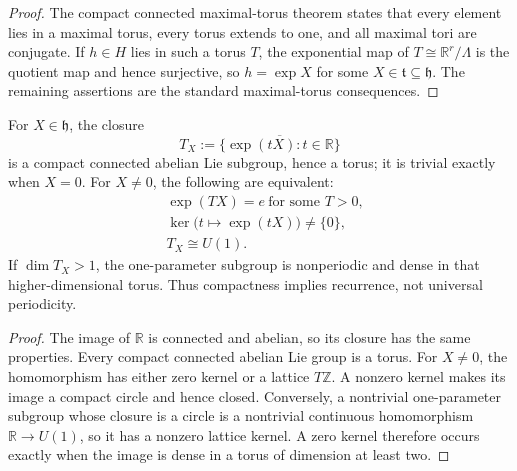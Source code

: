 \documentclass[11pt,a4paper]{article}
\begin{document}
\begin{proof}
The compact connected maximal-torus theorem states that every element lies in
a maximal torus, every torus extends to one, and all maximal tori are
conjugate.  If \(h\in H\) lies in such a torus \(T\), the exponential map of
\(T\cong\mathbb R^r/\Lambda\) is the quotient map and hence surjective, so
\(h=\exp X\) for some \(X\in\mathfrak t\subseteq\mathfrak h\).
The remaining assertions are the standard maximal-torus consequences.
\end{proof}

\begin{theorem}
\label{p2:thm:one-parameter-operation-closure}
For \(X\in\mathfrak h\), the closure
\[
 T_X:=\overline{\{\exp(tX):t\in\mathbb R\}}
\]
is a compact connected abelian Lie subgroup, hence a torus; it is trivial
exactly when \(X=0\).  For \(X\ne0\), the following are equivalent:
\[
\begin{split}
 &\exp(TX)=e\ \text{for some }T>0,\\
 &\ker\bigl(t\mapsto\exp(tX)\bigr)\ne\{0\},\\
 &T_X\cong U(1).
\end{split}
\]
If \(\dim T_X>1\), the one-parameter subgroup is nonperiodic and dense in
that higher-dimensional torus.  Thus compactness implies recurrence, not
universal periodicity.
\end{theorem}

\begin{proof}
The image of \(\mathbb R\) is connected and abelian, so its closure has the
same properties.  Every compact connected abelian Lie group is a torus.
For \(X\ne0\), the homomorphism has either zero kernel or a lattice
\(T\mathbb Z\).  A nonzero kernel makes its image a compact circle and hence
closed.  Conversely, a nontrivial one-parameter subgroup whose closure is a
circle is a nontrivial continuous homomorphism
\(\mathbb R\to U(1)\), so it has a nonzero lattice kernel.  A zero kernel
therefore occurs exactly when the image is dense in a torus of dimension at
least two.
\end{proof}
\end{document}
